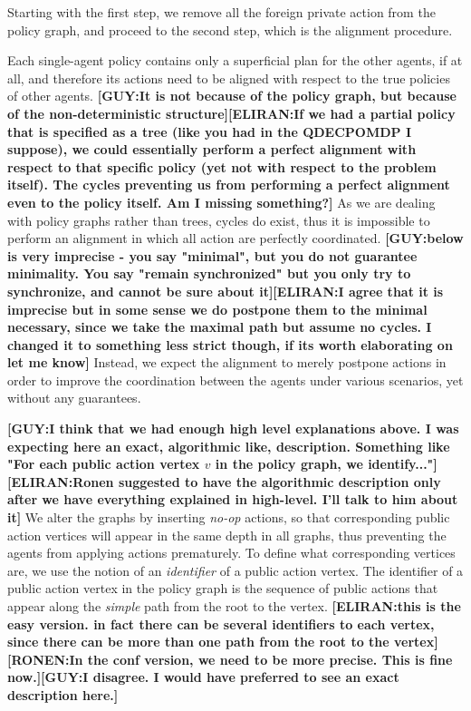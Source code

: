 \documentclass[letterpaper]{article} %
\newcommand{\eliran}[1]{\textbf{[\color{red}ELIRAN:#1]}}
\newcommand{\ronen}[1]{\textbf{[\color{blue}RONEN:#1]}}
\newcommand{\guy}[1]{\textbf{[\color{orange}GUY:#1]}}
\begin{document}
Starting with the first step, we remove all the foreign private action from the policy graph, and proceed to the second step, which is the alignment procedure.

Each single-agent policy contains only a superficial plan for the other agents, if at all, and therefore its actions need to be aligned with respect to the true policies of other agents. 
\guy{It is not because of the policy graph, but because of the non-deterministic structure}\eliran{If we had a partial policy that is specified as a tree (like you had in the QDECPOMDP I suppose), we could essentially perform a perfect alignment with respect to that specific policy (yet not with respect to the problem itself). The cycles preventing us from performing a perfect alignment even to the policy itself. Am I missing something?}
As we are dealing with policy graphs rather than trees, cycles do exist, thus it is impossible to perform an alignment in which all action are perfectly coordinated. 
\guy{below is very imprecise - you say "minimal", but you do not guarantee minimality. You say "remain synchronized" but you only try to synchronize, and cannot be sure about it}\eliran{I agree that it is imprecise but in some sense we do postpone them to the minimal necessary, since we take the maximal path but assume no cycles. I changed it to something less strict though, if its worth elaborating on let me know}
Instead, we expect the alignment to merely postpone actions in order to improve the coordination between the agents under various scenarios, yet without any guarantees.

\guy{I think that we had enough high level explanations above. I was expecting here an exact, algorithmic like, description. Something like "For each public action vertex $v$ in the policy graph, we identify..."}\eliran{Ronen suggested to have the algorithmic description only after we have everything explained in high-level. I'll talk to him about it}
We alter the graphs by inserting \emph{no-op} actions, so that corresponding public action vertices will appear in the same depth in all graphs, thus preventing the agents from applying actions prematurely.
To define what corresponding vertices are, we use the notion of an \emph{identifier} of a public action vertex. The identifier of a public action vertex in the policy graph is the
sequence of public actions that appear along the \emph{simple} path from the root to the vertex. \eliran{this is the easy version. in fact there can be several identifiers to each vertex, since there can be more than one path from the root to the vertex}
\ronen{In the conf version, we need to be more precise.
This is fine now.}\guy{I disagree. I would have preferred to see an exact description here.}
\end{document}
